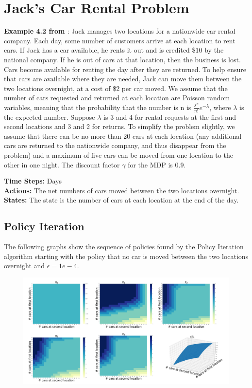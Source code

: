\documentclass{article}
\newcommand{\citecustom}[1]{\citeauthor{#1} \cite{#1}}
\begin{document}
\section{Jack's Car Rental Problem}
\textbf{Example 4.2 from \citecustom{sutton2018reinforcement}}: Jack manages two locations for a nationwide car
rental company. Each day, some number of customers arrive at each location to rent cars.
If Jack has a car available, he rents it out and is credited \$10 by the national company.
If he is out of cars at that location, then the business is lost. Cars become available for
renting the day after they are returned. To help ensure that cars are available where
they are needed, Jack can move them between the two locations overnight, at a cost of
\$2 per car moved. We assume that the number of cars requested and returned at each
location are Poisson random variables, meaning that the probability that the number is
n is $\frac{\lambda^{n}}{n!}e^{-\lambda}$, where $\lambda$ is the expected number. Suppose $\lambda$ is 3 and 4 for rental requests at
the first and second locations and 3 and 2 for returns. To simplify the problem slightly,
we assume that there can be no more than 20 cars at each location (any additional cars
are returned to the nationwide company, and thus disappear from the problem) and a
maximum of five cars can be moved from one location to the other in one night. The discount factor $\gamma$ for the MDP is 0.9.\par
	
\noindent %
\textbf{Time Steps:} Days \\
\textbf{Actions:} The net numbers of cars moved between the two locations overnight. \\
\textbf{States:} The state is the number of cars at each location at the end of the day. 

\subsection{Policy Iteration}
The following graphs show the sequence of policies found by the Policy Iteration algorithm starting with the policy that no car
is moved between the two locations overnight and $\epsilon=1e-4$.

\begin{figure}[H]
    \graphicspath{ {../Experiments/JackRentalProblem/PolicyIteration/} }
    \begin{center}
    \includegraphics[width=15cm]{Compact1.png}
    \end{center}
    \caption{}
\end{figure}
\end{document}
